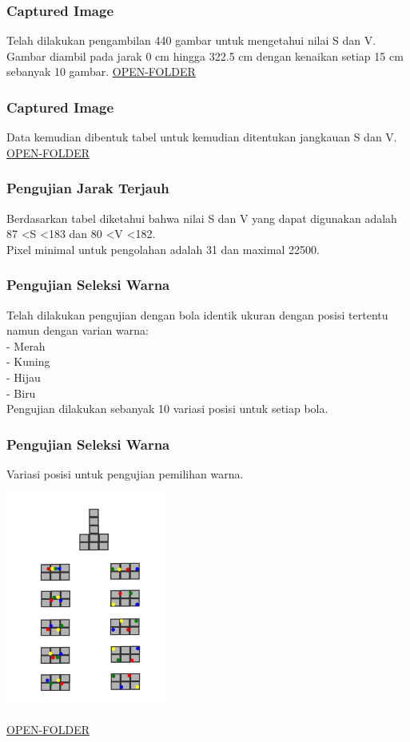 \documentclass[table,dvipsnames]{beamer}
\begin{document}
\begin{frame}
 \frametitle{Captured Image}
   Telah dilakukan pengambilan 440 gambar untuk mengetahui nilai S dan V.
   Gambar diambil pada jarak 0 cm hingga 322.5 cm dengan kenaikan setiap 15 cm sebanyak 10 gambar.
   \url{OPEN-FOLDER}
\end{frame}

\begin{frame}
 \frametitle{Captured Image}
   Data kemudian dibentuk tabel untuk kemudian ditentukan jangkauan S dan V.
   \url{OPEN-FOLDER}
\end{frame}

\begin{frame}
 \frametitle{Pengujian Jarak Terjauh}
 Berdasarkan tabel diketahui bahwa nilai S dan V yang dapat digunakan adalah 87 \textless S \textless 183 dan 80 \textless V \textless 182.\\
 Pixel minimal untuk pengolahan adalah 31 dan maximal 22500.
\end{frame}

\begin{frame}
 \frametitle{Pengujian Seleksi Warna}
 Telah dilakukan pengujian dengan bola identik ukuran dengan posisi tertentu namun dengan varian warna:\\
 - Merah\\
 - Kuning \\
 - Hijau \\
 - Biru \\
 Pengujian dilakukan sebanyak 10 variasi posisi untuk setiap bola.\\
\end{frame}

\begin{frame}
 \frametitle{Pengujian Seleksi Warna}
 Variasi posisi untuk pengujian pemilihan warna.
\begin{center}
 \includegraphics[width=150pt]{./proses_robot/uji_warna}
\end{center}
\url{OPEN-FOLDER}
\end{frame}
\end{document}
